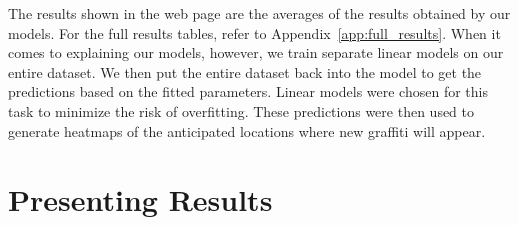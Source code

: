 The results shown in the web page are the averages of the results obtained by our models. For the full results tables, refer to Appendix~\ref{app:full_results}. When it comes to explaining our models, however, we train separate linear models on our entire dataset. We then put the entire dataset back into the model to get the predictions based on the fitted parameters. Linear models were chosen for this task to minimize the risk of overfitting. These predictions were then used to generate heatmaps of the anticipated locations where new graffiti will appear.

\section{Presenting Results}


